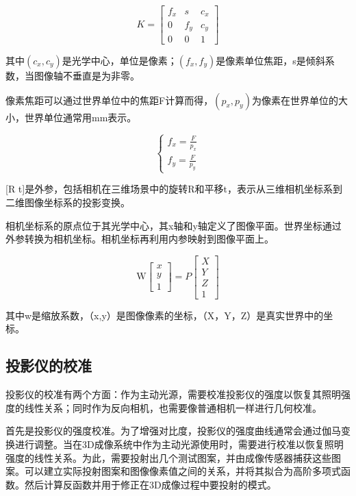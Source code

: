 \begin{equation}
  K = \left[\begin{array}{ccc}f_{x} & s & c_{x} \\0 & f_{y} & c_{y} \\0 & 0 & 1\end{array}\right]
\end{equation}

其中$(c_{x},c_{y})$是光学中心，单位是像素；$(f_{x},f_{y})$是像素单位焦距，s是倾斜系数，当图像轴不垂直是为非零。

像素焦距可以通过世界单位中的焦距F计算而得，$(p_{x},p_{y})$为像素在世界单位的大小，世界单位通常用mm表示。

\begin{equation}
  \left\{\begin{array}{l}f_{x}=\frac{F} {p_{x}} \\f_{y}=\frac{F} {p_{y}} \end{array}\right.
\end{equation}



[R t]是外参，包括相机在三维场景中的旋转R和平移t，表示从三维相机坐标系到二维图像坐标系的投影变换。

相机坐标系的原点位于其光学中心，其x轴和y轴定义了图像平面。世界坐标通过外参转换为相机坐标。相机坐标再利用内参映射到图像平面上。

\begin{equation}
  \mathrm{W}\left[\begin{array}{l}x \\y \\1\end{array}\right]=P\left[\begin{array}{l}X \\Y \\Z \\1\end{array}\right]
\end{equation}


其中w是缩放系数，（x,y）是图像像素的坐标，（X，Y，Z）是真实世界中的坐标。

\subsection{投影仪的校准}

投影仪的校准有两个方面：作为主动光源，需要校准投影仪的强度以恢复其照明强度的线性关系；同时作为反向相机，也需要像普通相机一样进行几何校准。

首先是投影仪的强度校准。为了增强对比度，投影仪的强度曲线通常会通过伽马变换进行调整。当在3D成像系统中作为主动光源使用时，需要进行校准以恢复照明强度的线性关系。为此，需要投射出几个测试图案，并由成像传感器捕获这些图案。可以建立实际投射图案和图像像素值之间的关系，并将其拟合为高阶多项式函数。然后计算反函数并用于修正在3D成像过程中要投射的模式。


